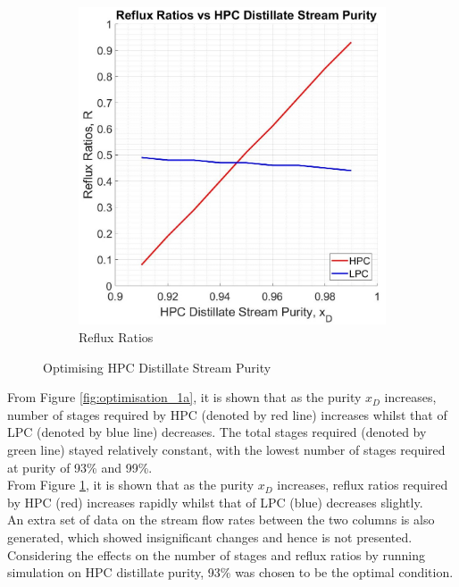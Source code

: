 \begin{figure}[ht]
\begin{subfigure}{0.49\textwidth}
            \includegraphics[width=\linewidth]{airseparation/graphics/graph-reflux_vs_HPCxD.jpg}
            \caption{Reflux Ratios} \label{fig:optimisation_1b}
        \end{subfigure}
        \caption{Optimising HPC Distillate Stream Purity} \label{fig:optimsation_1}
    \end{figure}
	\noindent From Figure \ref{fig:optimisation_1a}, it is shown that as the purity $x_D$ increases, number of stages required by HPC (denoted by red line) increases whilst that of LPC (denoted by blue line) decreases. The total stages required (denoted by green line) stayed relatively constant, with the lowest number of stages required at purity of 93\% and 99\%. \\
	From Figure \ref{fig:optimisation_1b}, it is shown that as the purity $x_D$ increases, reflux ratios required by HPC (red) increases rapidly whilst that of LPC (blue) decreases slightly. \\
	An extra set of data on the stream flow rates between the two columns is also generated, which showed insignificant changes and hence is not presented.\\
	Considering the effects on the number of stages and reflux ratios by running simulation on HPC distillate purity, 93\% was chosen to be the optimal condition.
